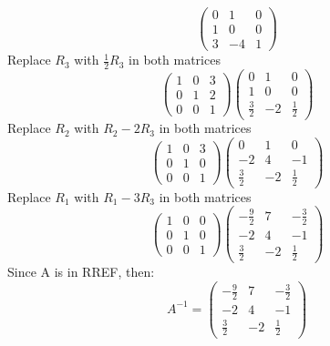 \documentclass{article}
\begin{document}
\begin{homeworkProblem}
$$\begin{pmatrix}
            0 & 1  & 0 \\
            1 & 0  & 0 \\
            3 & -4 & 1
        \end{pmatrix}$$
    Replace $R_3$ with $\frac{1}{2}R_3$ in both matrices
    $$\begin{pmatrix}
            1 & 0 & 3 \\
            0 & 1 & 2 \\
            0 & 0 & 1
        \end{pmatrix}
        \begin{pmatrix}
            0           & 1  & 0           \\
            1           & 0  & 0           \\
            \frac{3}{2} & -2 & \frac{1}{2}
        \end{pmatrix}$$
    Replace $R_2$ with $R_2 - 2R_3$ in both matrices
    $$\begin{pmatrix}
            1 & 0 & 3 \\
            0 & 1 & 0 \\
            0 & 0 & 1
        \end{pmatrix}
        \begin{pmatrix}
            0           & 1  & 0           \\
            -2          & 4  & -1          \\
            \frac{3}{2} & -2 & \frac{1}{2}
        \end{pmatrix}$$
    Replace $R_1$ with $R_1 - 3R_3$ in both matrices
    $$\begin{pmatrix}
            1 & 0 & 0 \\
            0 & 1 & 0 \\
            0 & 0 & 1
        \end{pmatrix}
        \begin{pmatrix}
            -\frac{9}{2} & 7  & -\frac{3}{2} \\
            -2           & 4  & -1           \\
            \frac{3}{2}  & -2 & \frac{1}{2}
        \end{pmatrix}$$
    Since A is in RREF, then:
    $$A^{-1} = \begin{pmatrix}
            -\frac{9}{2} & 7  & -\frac{3}{2} \\
            -2           & 4  & -1           \\
            \frac{3}{2}  & -2 & \frac{1}{2}
        \end{pmatrix}$$
\end{homeworkProblem}
\end{document}
